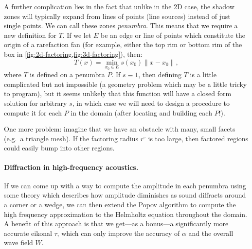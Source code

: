 \documentclass{article}
\begin{document}
A further complication lies in the fact that unlike in the 2D case,
the shadow zones will typically expand from lines of points (line
sources) instead of just single points. We can call these zones
\emph{penumbra}. This means that we require a new definition for
$T$. If we let $E$ be an edge or line of points which constitute the
origin of a rarefaction fan (for example, either the top rim or bottom
rim of the box in \cref{fig:2d-factoring,fig:3d-factoring}), then:
\begin{equation}
  T(x) = \min_{x_0 \in E} s(x_0) \|x - x_0\|,
\end{equation}
where $T$ is defined on a penumbra $P$. If $s \equiv 1$, then defining
$T$ is a little complicated but not impossible (a geometry problem
which may be a little tricky to program), but it seems unlikely that
this function will have a closed form solution for arbitrary $s$, in
which case we will need to design a procedure to compute it for each
$P$ in the domain (after locating and building each $P$!).

One more problem: imagine that we have an obstacle with many, small
facets (e.g.\ a triangle mesh). If the factoring radius $r^\circ$ is
too large, then factored regions could easily bump into other regions.

\paragraph{Diffraction in high-frequency acoustics.} If we can come up
with a way to compute the amplitude in each penumbra using some theory
which describes how amplitude diminishes as sound diffracts around a
corner or a wedge, we can then extend the Popov algorithm to compute
the high frequency approximation to the Helmholtz equation throughout
the domain. A benefit of this approach is that we get---as a bonus---a
significantly more accurate eikonal $\tau$, which can only improve the
accuracy of $\alpha$ and the overall wave field $W$.
\end{document}
